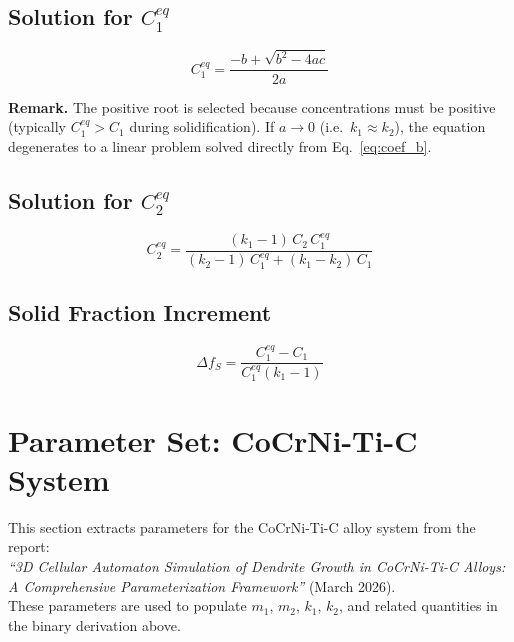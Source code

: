 \documentclass[12pt, a4paper]{article}
\begin{document}
\subsection{Solution for $C_1^{eq}$}

\begin{equation}
  \boxed{C_1^{eq} = \frac{-b + \sqrt{b^2 - 4ac}}{2a}}
  \label{eq:C1eq}
\end{equation}

\textbf{Remark.} The positive root is selected because concentrations must be positive
(typically $C_1^{eq} > C_1$ during solidification). If $a \to 0$ (i.e.\ $k_1 \approx k_2$),
the equation degenerates to a linear problem solved directly from Eq.~\eqref{eq:coef_b}.

\subsection{Solution for $C_2^{eq}$}

\begin{equation}
  \boxed{C_2^{eq} = \frac{(k_1-1)\,C_2\,C_1^{eq}}
                         {(k_2-1)\,C_1^{eq} + (k_1-k_2)\,C_1}}
  \label{eq:C2eq_final}
\end{equation}

\subsection{Solid Fraction Increment}

\begin{equation}
  \boxed{\Delta f_S = \frac{C_1^{eq} - C_1}{C_1^{eq}(k_1-1)}}
  \label{eq:DeltaFS}
\end{equation}

\newpage
\section{Parameter Set: CoCrNi-Ti-C System}

This section extracts parameters for the CoCrNi-Ti-C alloy system from the report:\\
\textit{``3D Cellular Automaton Simulation of Dendrite Growth in CoCrNi-Ti-C Alloys:
A Comprehensive Parameterization Framework''} (March 2026).\\
These parameters are used to populate $m_1$, $m_2$, $k_1$, $k_2$, and related
quantities in the binary derivation above.
\end{document}
